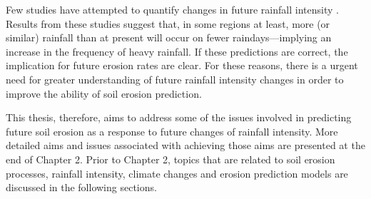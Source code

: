 Few studies have attempted to quantify changes in future rainfall intensity
\citep{karl1995-217,houghton1996-climate,watson1998-517,karl1998-231,
osborn1998-505,osborn2002-1313}. Results from these studies suggest that, in
some regions at least, more (or similar) rainfall than at present will occur on
fewer raindays---implying an increase in the frequency of heavy rainfall. If
these predictions are correct,
the implication for future erosion rates are clear. For these reasons, there is
a urgent need for greater understanding of future rainfall intensity changes in
order to improve the ability of soil erosion prediction.

This thesis, therefore, aims to address some of the issues involved in
predicting future soil erosion as a response to future changes of rainfall
intensity. More detailed aims and issues associated with achieving those aims
are presented at the end of Chapter 2. Prior to Chapter 2, topics that are
related to soil erosion processes, rainfall intensity, climate changes and
erosion prediction models are discussed in the following sections.






